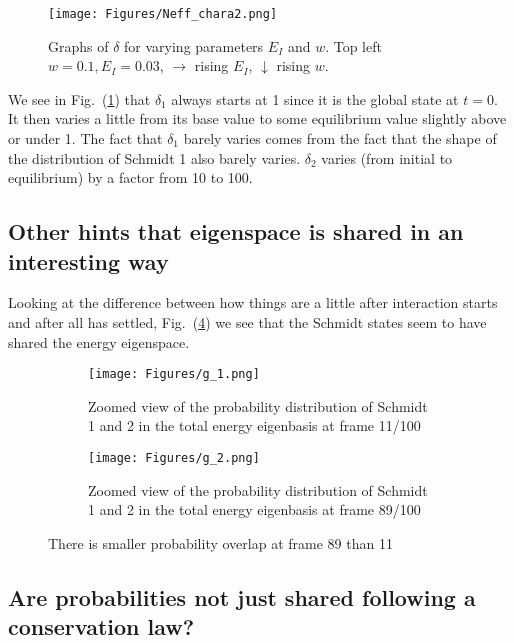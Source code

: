 \documentclass{article}
\begin{document}
\begin{figure}[h]
    \centering
    \texttt{[image: Figures/Neff\_chara2.png]}
    \caption{Graphs of $\delta$ for varying parameters $E_I$ and $w$. Top left $w=0.1, E_I=0.03$, $\rightarrow$ rising $E_I$, $\downarrow$ rising $w$.}
    \label{fig:characteriazation_Neff}
\end{figure}


We see in Fig.~(\ref{fig:characteriazation_Neff}) that $\delta_1$ always starts at 1 since it is the global state at $t=0$. It then varies a little from its base value to some equilibrium value slightly above or under 1. The fact that $\delta_1$ barely varies comes from the fact that the shape of the distribution of Schmidt 1 also barely varies. $\delta_2$ varies (from initial to equilibrium) by a factor from 10 to 100.

\subsection{Other hints that eigenspace is shared in an interesting way}

Looking at the difference between how things are a little after interaction starts and after all has settled, Fig.~(\ref{fig:gif_compare}) we see that the Schmidt states seem to have shared the energy eigenspace.

\begin{figure}[h!]
  \centering
  \begin{subfigure}[b]{0.4\linewidth}
    \texttt{[image: Figures/g\_1.png]}
    \caption{Zoomed view of the probability distribution of Schmidt 1 and 2 in the total energy eigenbasis at frame 11/100}
    \label{fig:1}
  \end{subfigure}
  \begin{subfigure}[b]{0.4\linewidth}
    \texttt{[image: Figures/g\_2.png]}
    \caption{Zoomed view of the probability distribution of Schmidt 1 and 2 in the total energy eigenbasis at frame 89/100}
    \label{fig:2}
  \end{subfigure}
  \caption{There is smaller probability overlap at frame 89 than 11}
  \label{fig:gif_compare}
\end{figure}

\subsection{Are probabilities not just shared following a conservation law?}
\end{document}
